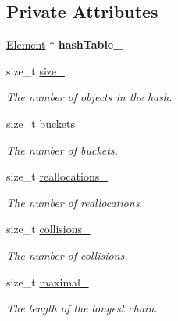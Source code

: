 \subsection*{Private Attributes}
\begin{DoxyCompactItemize}
\item 
\hypertarget{class_hash_set_a48e5037452fe348a0158bc458a75addf}{\hyperlink{class_hash_set_1_1_element}{Element} $\ast$ {\bfseries hash\-Table\-\_\-}}\label{class_hash_set_a48e5037452fe348a0158bc458a75addf}

\item 
\hypertarget{class_hash_set_a927cc07bbfc932aaaa985b50990d4126}{size\-\_\-t \hyperlink{class_hash_set_a927cc07bbfc932aaaa985b50990d4126}{size\-\_\-}}\label{class_hash_set_a927cc07bbfc932aaaa985b50990d4126}

\begin{DoxyCompactList}\small\item\em The number of objects in the hash. \end{DoxyCompactList}\item 
\hypertarget{class_hash_set_a929b2d9417ba1cdff9577d4f0357810e}{size\-\_\-t \hyperlink{class_hash_set_a929b2d9417ba1cdff9577d4f0357810e}{buckets\-\_\-}}\label{class_hash_set_a929b2d9417ba1cdff9577d4f0357810e}

\begin{DoxyCompactList}\small\item\em The number of buckets. \end{DoxyCompactList}\item 
\hypertarget{class_hash_set_a70a507309fe986092691a68fb7d006ad}{size\-\_\-t \hyperlink{class_hash_set_a70a507309fe986092691a68fb7d006ad}{reallocations\-\_\-}}\label{class_hash_set_a70a507309fe986092691a68fb7d006ad}

\begin{DoxyCompactList}\small\item\em The number of reallocations. \end{DoxyCompactList}\item 
\hypertarget{class_hash_set_acc755fe1139cf94e303c9b3c98ea3c35}{size\-\_\-t \hyperlink{class_hash_set_acc755fe1139cf94e303c9b3c98ea3c35}{collisions\-\_\-}}\label{class_hash_set_acc755fe1139cf94e303c9b3c98ea3c35}

\begin{DoxyCompactList}\small\item\em The number of collisions. \end{DoxyCompactList}\item 
\hypertarget{class_hash_set_af3d4c11d45397596369b76c964382888}{size\-\_\-t \hyperlink{class_hash_set_af3d4c11d45397596369b76c964382888}{maximal\-\_\-}}\label{class_hash_set_af3d4c11d45397596369b76c964382888}

\begin{DoxyCompactList}\small\item\em The length of the longest chain. \end{DoxyCompactList}\end{DoxyCompactItemize}
